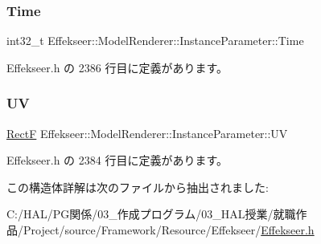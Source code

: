 \subsubsection{\texorpdfstring{Time}{Time}}
{\footnotesize\ttfamily int32\+\_\+t Effekseer\+::\+Model\+Renderer\+::\+Instance\+Parameter\+::\+Time}



 Effekseer.\+h の 2386 行目に定義があります。

\mbox{\label{struct_effekseer_1_1_model_renderer_1_1_instance_parameter_a8093686e2945cecdfcb99420bacca07d}} 
\subsubsection{\texorpdfstring{UV}{UV}}
{\footnotesize\ttfamily \mbox{\hyperlink{struct_effekseer_1_1_rect_f}{RectF}} Effekseer\+::\+Model\+Renderer\+::\+Instance\+Parameter\+::\+UV}



 Effekseer.\+h の 2384 行目に定義があります。



この構造体詳解は次のファイルから抽出されました\+:\begin{DoxyCompactItemize}
\item 
C\+:/\+H\+A\+L/\+P\+G関係/03\+\_\+作成プログラム/03\+\_\+\+H\+A\+L授業/就職作品/\+Project/source/\+Framework/\+Resource/\+Effekseer/\mbox{\hyperlink{_effekseer_8h}{Effekseer.\+h}}\end{DoxyCompactItemize}
